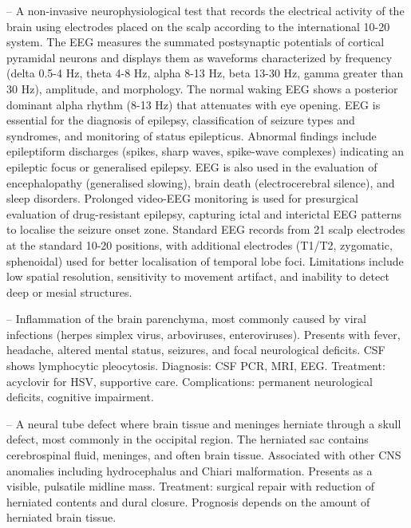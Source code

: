 -- A non-invasive neurophysiological test that records the electrical activity of the brain using electrodes placed on the scalp according to the international 10-20 system. The EEG measures the summated postsynaptic potentials of cortical pyramidal neurons and displays them as waveforms characterized by frequency (delta 0.5-4 Hz, theta 4-8 Hz, alpha 8-13 Hz, beta 13-30 Hz, gamma greater than 30 Hz), amplitude, and morphology. The normal waking EEG shows a posterior dominant alpha rhythm (8-13 Hz) that attenuates with eye opening. EEG is essential for the diagnosis of epilepsy, classification of seizure types and syndromes, and monitoring of status epilepticus. Abnormal findings include epileptiform discharges (spikes, sharp waves, spike-wave complexes) indicating an epileptic focus or generalised epilepsy. EEG is also used in the evaluation of encephalopathy (generalised slowing), brain death (electrocerebral silence), and sleep disorders. Prolonged video-EEG monitoring is used for presurgical evaluation of drug-resistant epilepsy, capturing ictal and interictal EEG patterns to localise the seizure onset zone. Standard EEG records from 21 scalp electrodes at the standard 10-20 positions, with additional electrodes (T1/T2, zygomatic, sphenoidal) used for better localisation of temporal lobe foci. Limitations include low spatial resolution, sensitivity to movement artifact, and inability to detect deep or mesial structures.

-- Inflammation of the brain parenchyma, most commonly caused by viral infections (herpes simplex virus, arboviruses, enteroviruses). Presents with fever, headache, altered mental status, seizures, and focal neurological deficits. CSF shows lymphocytic pleocytosis. Diagnosis: CSF PCR, MRI, EEG. Treatment: acyclovir for HSV, supportive care. Complications: permanent neurological deficits, cognitive impairment.

-- A neural tube defect where brain tissue and meninges herniate through a skull defect, most commonly in the occipital region. The herniated sac contains cerebrospinal fluid, meninges, and often brain tissue. Associated with other CNS anomalies including hydrocephalus and Chiari malformation. Presents as a visible, pulsatile midline mass. Treatment: surgical repair with reduction of herniated contents and dural closure. Prognosis depends on the amount of herniated brain tissue.

